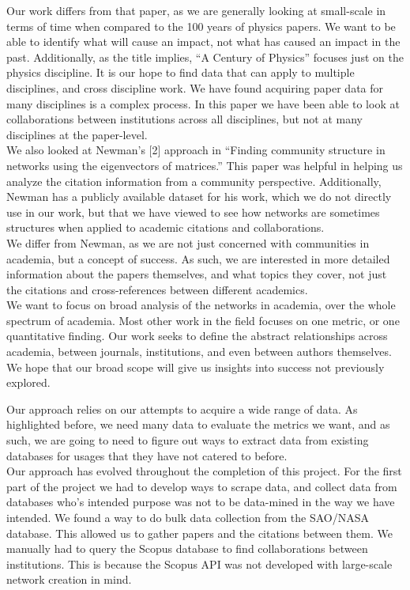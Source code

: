 \documentclass[times, 10pt,twocolumn]{article}
\begin{document}
Our work differs from that paper, as we are generally looking at small-scale in terms of time when compared to the 100 years of physics papers. We want to be able to identify what will cause an impact, not what has caused an impact in the past. Additionally, as the title implies, “A Century of Physics” focuses just on the physics discipline. It is our hope to find data that can apply to multiple disciplines, and cross discipline work. We have found  acquiring paper data for many disciplines is a complex process. In this paper we have been able to look at collaborations between institutions across all disciplines, but not at many disciplines at the paper-level. \\

We also looked at Newman’s [2] approach in “Finding community structure in networks using the eigenvectors of matrices.” This paper was helpful in helping us analyze the citation information from a community perspective. Additionally, Newman has a publicly available dataset for his work, which we do not directly use in our work, but that we have viewed to see how networks are sometimes structures when applied to academic citations and collaborations.\\

We differ from Newman, as we are not just concerned with communities in academia, but a concept of success. As such, we are interested in more detailed information about the papers themselves, and what topics they cover, not just the citations and cross-references between different academics. \\

We want to focus on broad analysis of the networks in academia, over the whole spectrum of academia. Most other work in the field focuses on one metric, or one quantitative finding. Our work seeks to define the abstract relationships across academia, between journals, institutions, and even between authors themselves. We hope that our broad scope will give us insights into success not previously explored.

Our approach relies on our attempts to acquire a wide range of data. As highlighted before, we need many data to evaluate the metrics we want, and as such, we are going to need to figure out ways to extract data from existing databases for usages that they have not catered to before.\\

Our approach has evolved throughout the completion of this project. For the first part of the project we had to develop ways to scrape data, and collect data from databases who's intended purpose was not to be data-mined in the way we have intended. We found a way to do bulk data collection from the SAO/NASA database. This allowed us to gather papers and the citations between them. We manually had to query the Scopus database to find collaborations between institutions. This is because the Scopus API was not developed with large-scale network creation in mind. \\
\end{document}
